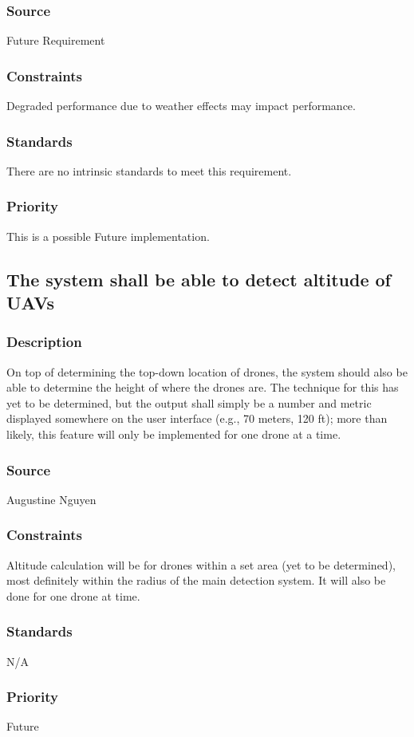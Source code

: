 \subsubsection{Source}
Future Requirement
\subsubsection{Constraints}
Degraded performance due to weather effects may impact performance.
\subsubsection{Standards}
There are no intrinsic standards to meet this requirement.
\subsubsection{Priority}
This is a possible Future implementation.

\subsection{The system shall be able to detect altitude of UAVs}
\subsubsection{Description}
On top of determining the top-down location of drones, the system should also be able to determine the height of where the drones are.  The technique for this has yet to be determined, but the output shall simply be a number and metric displayed somewhere on the user interface (e.g., 70 meters, 120 ft); more than likely, this feature will only be implemented for one drone at a time.
\subsubsection{Source}
Augustine Nguyen
\subsubsection{Constraints}
Altitude calculation will be for drones within a set area (yet to be determined), most definitely within the radius of the main detection system.  It will also be done for one drone at time.
\subsubsection{Standards}
N/A
\subsubsection{Priority}
Future

